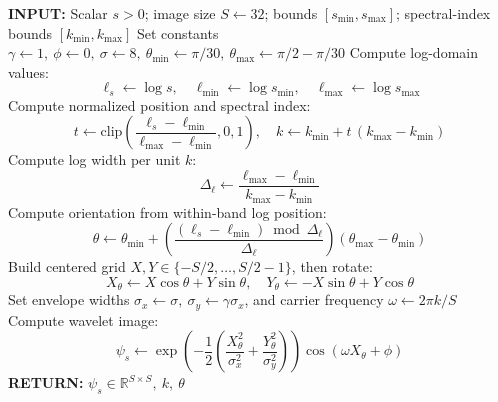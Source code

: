 \documentclass[preprint,review,12pt,numafflabel]{elsarticle}
\begin{document}
\begin{algorithm}[H]
\caption{Scalar Wavelet Encoding}
\label{alg:eigenfrequency_wavelet_encoding}
\begin{algorithmic}[1]
\STATE \textbf{INPUT:} Scalar \( s>0 \); image size \( S \leftarrow 32 \); bounds \( [s_{\min}, s_{\max}] \); spectral-index bounds \( [k_{\min}, k_{\max}] \)
\STATE Set constants \( \gamma \leftarrow 1,\ \phi \leftarrow 0,\ \sigma \leftarrow 8,\ \theta_{\min}\leftarrow \pi/30,\ \theta_{\max}\leftarrow \pi/2-\pi/30 \)
\STATE Compute log-domain values:
\[
\ell_s \leftarrow \log s,\quad \ell_{\min}\leftarrow \log s_{\min},\quad \ell_{\max}\leftarrow \log s_{\max}
\]
\STATE Compute normalized position and spectral index:
\[
t \leftarrow \mathrm{clip}\!\left(\frac{\ell_s-\ell_{\min}}{\ell_{\max}-\ell_{\min}},0,1\right),\quad
k \leftarrow k_{\min} + t\,(k_{\max}-k_{\min})
\]
\STATE Compute log width per unit \(k\):
\[
\Delta_\ell \leftarrow \frac{\ell_{\max}-\ell_{\min}}{k_{\max}-k_{\min}}
\]
\STATE Compute orientation from within-band log position:
\[
\theta \leftarrow \theta_{\min} + \left(\frac{(\ell_s-\ell_{\min})\bmod \Delta_\ell}{\Delta_\ell}\right)\left(\theta_{\max}-\theta_{\min}\right)
\]
\STATE Build centered grid \(X,Y \in \{-S/2,\dots,S/2-1\}\), then rotate:
\[
X_\theta \leftarrow X\cos\theta + Y\sin\theta,\quad
Y_\theta \leftarrow -X\sin\theta + Y\cos\theta
\]
\STATE Set envelope widths \( \sigma_x \leftarrow \sigma,\ \sigma_y \leftarrow \gamma \sigma_x \), and carrier frequency \( \omega \leftarrow 2\pi k/S \)
\STATE Compute wavelet image:
\[
\psi_s \leftarrow
\exp\!\left(-\frac{1}{2}\left(\frac{X_\theta^2}{\sigma_x^2}+\frac{Y_\theta^2}{\sigma_y^2}\right)\right)\cos(\omega X_\theta+\phi)
\]
\STATE \textbf{RETURN:} \( \psi_s \in \mathbb{R}^{S\times S},\ k,\ \theta \)
\end{algorithmic}
\end{algorithm}
\end{document}
